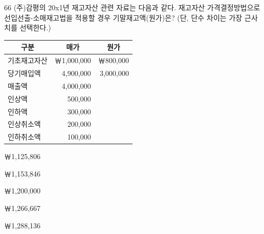 \begin{question}{66}
(주)감평의 20x1년 재고자산 관련 자료는 다음과 같다. 재고자산 가격결정방법으로 선입선출-소매재고법을 적용할 경우 기말재고액(원가)은? (단, 단수 차이는 가장 근사치를 선택한다.)
\par{\small\centering\begin{tabular}{|l|r|r|}
\hline
\multicolumn{1}{|c|}{구분} & \multicolumn{1}{c|}{매가} & \multicolumn{1}{c|}{원가} \\ \hline
기초재고자산 & ￦1,000,000 & ￦800,000 \\ \hline
당기매입액 & 4,900,000 & 3,000,000 \\ \hline
매출액 & 4,000,000 & \\ \hline
인상액 & 500,000 & \\ \hline
인하액 & 300,000 & \\ \hline
인상취소액 & 200,000 & \\ \hline
인하취소액 & 100,000 & \\ \hline
\end{tabular}\par}
\begin{choices}
  \item ￦1,125,806
  \item ￦1,153,846
  \item ￦1,200,000
  \item ￦1,266,667
  \item ￦1,288,136
\end{choices}
\end{question}
